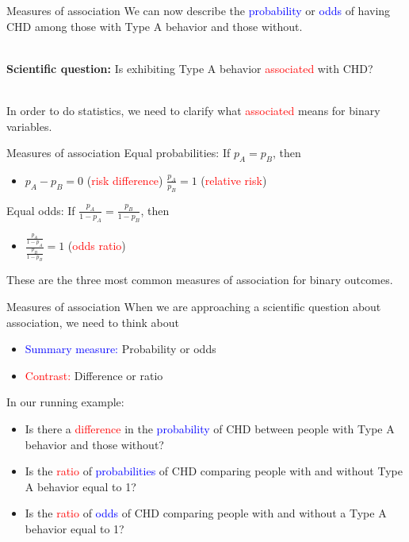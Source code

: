 \documentclass[10pt,t]{beamer}
\begin{document}
\begin{frame}{Measures of association}
	We can now describe the \textcolor{blue}{probability} or \textcolor{blue}{odds} of having CHD among those with Type A behavior and those without. 
	\\ ~\
	
	\textbf{Scientific question:} Is exhibiting Type A behavior \textcolor{red}{associated} with CHD? 
	\\ ~\
	
	In order to do statistics, we need to clarify what \textcolor{red}{associated} means for binary variables.
\end{frame}

\begin{frame}{Measures of association}
Equal probabilities: If $p_A = p_B$, then
	\begin{itemize}
		\item[] $p_A - p_B = 0$ (\textcolor{red}{risk difference}) \quad \quad \quad $\frac{p_A}{p_B} = 1$ (\textcolor{red}{relative risk})
	\end{itemize}\pause 
	\vspace{0.8cm}
Equal odds: If $\frac{p_A}{1-p_A} = \frac{p_B}{1-p_B}$, then
	\begin{itemize}
		\item[] $\frac{\frac{p_A}{1-p_A}}{\frac{p_B}{1-p_B}}=1$ (\textcolor{red}{odds ratio})
	\end{itemize}
\vspace{0.8cm}
These are the three most common measures of association for binary outcomes. 
\end{frame}

\begin{frame}{Measures of association}
When we are approaching a scientific question about association, we need to think about
\begin{itemize}
	\item \textcolor{blue}{Summary measure:} Probability or odds
	\item \textcolor{red}{Contrast:} Difference or ratio
\end{itemize}
\vspace{0.5cm}\pause 
In our running example:
\begin{itemize}
	\item Is there a \textcolor{red}{difference} in the \textcolor{blue}{probability} of CHD between people with Type A behavior and those without? \pause
	\item Is the \textcolor{red}{ratio} of \textcolor{blue}{probabilities} of CHD comparing people with and without Type A behavior equal to 1? \pause
	\item Is the \textcolor{red}{ratio} of \textcolor{blue}{odds} of CHD comparing people with and without a Type A behavior equal to 1? 
\end{itemize}
\end{frame}
\end{document}
